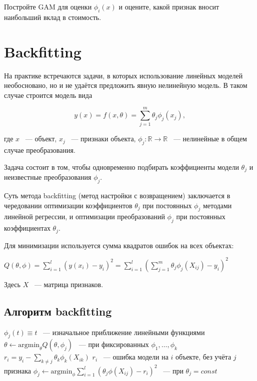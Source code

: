 {Постройте GAM для оценки $\phi_i(x)$ и оцените, какой признак вносит наибольший вклад в стоимость.





\section{Backfitting}

На практике встречаются задачи, в которых использование линейных моделей необосновано, но и не удаётся предложить явную нелинейную модель. В таком случае строится модель вида

$$\displaystyle y(x)=f(x,\theta)=\sum_{j=1}^m\theta_j \phi_j(x_j),$$

где $x$ ~--- объект, $x_j$ ~--- признаки объекта, $\phi_j:\mathbb{R}\rightarrow \mathbb{R}$ ~--- нелинейные в общем случае преобразования.

Задача состоит в том, чтобы одновременно подбирать коэффициенты модели $\theta_j$ и неизвестные преобразования $\phi_j$.

Суть метода backfitting (метод настройки с возвращением) заключается в чередовании оптимизации коэффициентов $\theta_j$ при постоянных $\phi_j$ методами линейной регрессии, и оптимизации преобразований $\phi_j$ при постоянных коэффициентах $\theta_j$. 

Для минимизации используется сумма квадратов ошибок на всех объектах:

$Q(\theta, \phi) = \displaystyle \sum_{i=1}^l \left( y(x_i) - y_i \right)^2 = \sum_{i=1}^l \left( \sum_{j=1}^m \theta_j \phi_j(X_{ij}) - y_i \right)^2 $

Здесь $X$ ~--- матрица признаков.

\subsection{Алгоритм backfitting}
\begin{algorithmic}
\State $\phi_j(t) \equiv t$ ~--- изначальное приближение линейными функциями
    \State $\theta \gets \text{argmin}_{\theta}Q(\theta, \phi_j)$ ~--- при фиксированных $\phi_1,\dots, \phi_k$
        \State $\displaystyle r_i = y_i - \sum_{k\neq j} \theta_k \phi_k(X_{ik})$
        \State $r_i$ ~--- ошибка модели на $i$ объекте, без учёта $j$ признака
        \State $\displaystyle\phi_j \gets \text{argmin}_{\phi} \sum_{i=1}^l \left( \theta_j \phi(X_{ij}) - r_i \right)^2$ ~--- при $\theta_j=const$
    \EndFor
\EndWhile 
\end{algorithmic}

}
